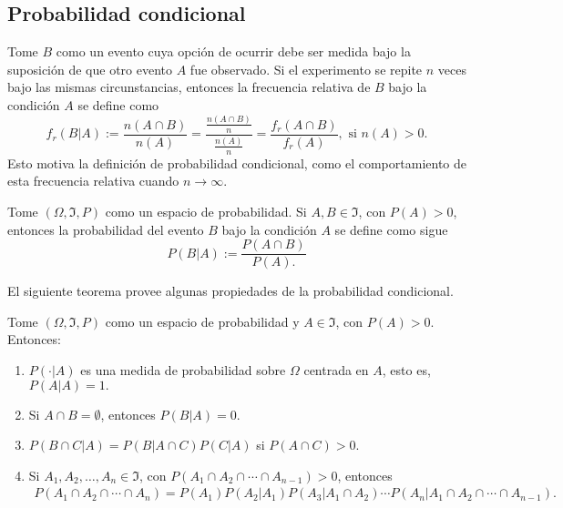 	\subsection{Probabilidad condicional}
	Tome $B$ como un evento cuya opción de ocurrir debe ser medida bajo la suposición de que otro evento $A$ fue observado. Si el experimento se repite $n$ veces bajo las mismas circunstancias, entonces la frecuencia relativa de $B$ bajo la condición $A$ se define como
		$$f_r(B|A):=\frac{n(A\cap B)}{n(A)}=\frac{\frac{n(A\cap B)}{n}}{\frac{n(A)}{n}}=\frac{f_r(A\cap B)}{f_r(A)}, \text{ si }n(A)>0.$$
		Esto motiva la definición de probabilidad condicional, como el comportamiento de esta frecuencia relativa cuando $n\rightarrow\infty$.
		\begin{defi}
			Tome $(\Omega, \Im, P)$ como un espacio de probabilidad. Si $A,B\in\Im$, con $P(A)>0$, entonces la probabilidad del evento $B$ bajo la condición $A$ se define como sigue
			$$P(B|A):=\frac{P(A\cap B)}{P(A).}$$
		\end{defi}
		El siguiente teorema provee algunas propiedades de la probabilidad condicional.
		\begin{theo}
			Tome $(\Omega, \Im, P)$ como un espacio de probabilidad y $A\in\Im$, con $P(A)>0$. Entonces:
			\begin{enumerate}
				\item $P(\cdot | A)$ es una medida de probabilidad sobre $\Omega$ centrada en $A$, esto es, $P(A|A)=1.$
				\item Si $A\cap B=\emptyset$, entonces $P(B|A)=0$.
				\item $P(B\cap C |A)=P(B|A\cap C)P(C|A)$ si $P(A\cap C)>0$.
				\item Si $A_1,A_2,\dots,A_n\in\Im$, con $P(A_1\cap A_2\cap\cdots\cap A_{n-1})>0$, entonces
				\begin{align*}
				P(A_1\cap A_2\cap\cdots\cap A_n)=P(A_1)P(A_2|A_1)P(A_3|A_1\cap A_2)\cdots P(A_n|A_1\cap A_2\cap \cdots\cap A_{n-1}).
				\end{align*}
			\end{enumerate}
		\end{theo}		
		

